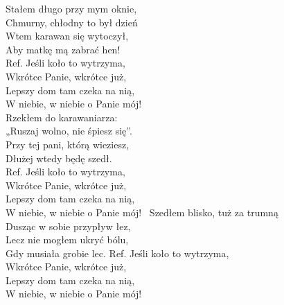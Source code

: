 
Stałem długo przy mym oknie, \\
Chmurny, chłodny to był dzień \\
Wtem karawan się wytoczył, \tab{}\\
Aby matkę mą zabrać hen! \tab{}\\
\hops
Ref. Jeśli koło to wytrzyma, \tab{}\\
 Wkrótce Panie, wkrótce już,\\
 Lepszy dom tam czeka na nią,\\
 W niebie, w niebie o Panie mój!\\
\hops
Rzekłem do karawaniarza:\\
„Ruszaj wolno, nie śpiesz się”.\\
Przy tej pani, którą wieziesz,\\
Dłużej wtedy będę szedł.\\
\hops
Ref. Jeśli koło to wytrzyma,\\
 Wkrótce Panie, wkrótce już,\\
 Lepszy dom tam czeka na nią,\\
 W niebie, w niebie o Panie mój!\
\hops
Szedłem blisko, tuż za trumną\\
Dusząc w sobie przypływ łez,\\
Lecz nie mogłem ukryć bólu,\\
Gdy musiała grobie lec.
\hops
Ref. Jeśli koło to wytrzyma,\\
 Wkrótce Panie, wkrótce już,\\
 Lepszy dom tam czeka na nią,\\
\refr W niebie, w niebie o Panie mój!